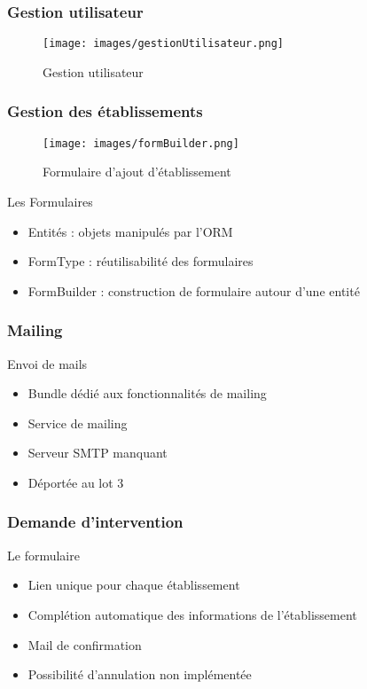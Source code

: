 \speaker{\Florian}

\begin{frame}
\frametitle{Gestion utilisateur}
      \begin{figure}[h]
	\texttt{[image: images/gestionUtilisateur.png]}
	\caption{Gestion utilisateur}
		  \end{figure}

\end{frame}

\begin{frame}
\frametitle{Gestion des établissements}
\begin{minipage}[c]{.35\linewidth}
      \begin{figure}[h]
		\texttt{[image: images/formBuilder.png]}
			\caption{\small{Formulaire d'ajout d'établissement}}
	  \end{figure}
   \end{minipage} \hfill
   \begin{minipage}[c]{.4\linewidth}
      \begin{block}{Les Formulaires}
		\begin{itemize}
			\item Entités : objets manipulés par l'ORM
			\item FormType : réutilisabilité des formulaires
			\item FormBuilder : construction de formulaire autour d'une entité
		\end{itemize}
	  \end{block}
   \end{minipage} \hfill
\end{frame}

\begin{frame}
\frametitle{Mailing}
\begin{block}{Envoi de mails}
	\begin{itemize}
		\item Bundle dédié aux fonctionnalités de mailing
		\item Service de mailing
		\item Serveur SMTP manquant
		\item Déportée au lot 3
	\end{itemize}
\end{block}
\end{frame}

\begin{frame}
\frametitle{Demande d'intervention}
\begin{block}{Le formulaire}
	\begin{itemize}
		\item Lien unique pour chaque établissement
		\item Complétion automatique des informations de l'établissement
		\item Mail de confirmation
		\item Possibilité d'annulation non implémentée
	\end{itemize}
\end{block}
\end{frame}